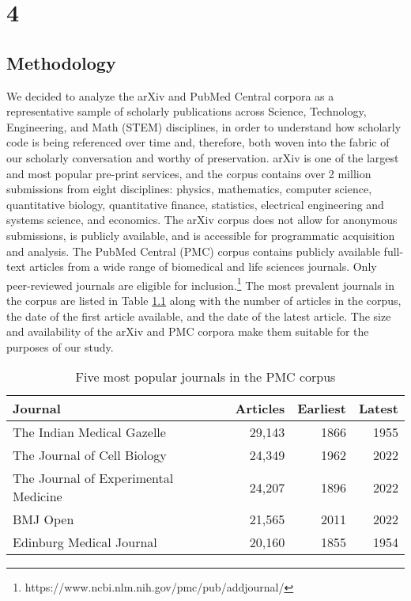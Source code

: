 \chapter{4}
\label{ch:4}


\section{Methodology}
We decided to analyze the arXiv and PubMed Central corpora as a representative sample of scholarly publications across Science, Technology, Engineering, and Math (STEM) disciplines, in order to understand how scholarly code is being referenced over time and, therefore, both woven into the fabric of our scholarly conversation and worthy of preservation. arXiv is one of the largest and most popular pre-print services, and the corpus contains over 2 million submissions \cite{fromme-cornell2022} from eight disciplines: physics, mathematics, computer science, quantitative biology, quantitative finance, statistics, electrical engineering and systems science, and economics. The arXiv corpus does not allow for anonymous submissions, is publicly available, and is accessible for programmatic acquisition and analysis. The PubMed Central (PMC) corpus contains publicly available full-text articles from a wide range of biomedical and life sciences journals. Only peer-reviewed journals are eligible for inclusion.\footnote{https://www.ncbi.nlm.nih.gov/pmc/pub/addjournal/} The most prevalent journals in the corpus are listed in Table \ref{tab:pmc_corpus} along with the number of articles in the corpus, the date of the first article available, and the date of the latest article. The size and availability of the arXiv and PMC corpora make them suitable for the purposes of our study.  

\begin{table}
  \centering
  \begin{tabular}{|l|r|r|r|}
    \hline
    Journal & Articles & Earliest & Latest\\
    \hline
    The Indian Medical Gazelle & 29,143 & 1866 & 1955\\
    The Journal of Cell Biology & 24,349 & 1962 & 2022\\
    The Journal of Experimental Medicine & 24,207 & 1896 & 2022\\
    BMJ Open & 21,565 & 2011 & 2022 \\
    Edinburg Medical Journal & 20,160 & 1855 & 1954\\
  \hline
\end{tabular}
\caption{Five most popular journals in the PMC corpus}
\label{tab:pmc_corpus}
\end{table}

